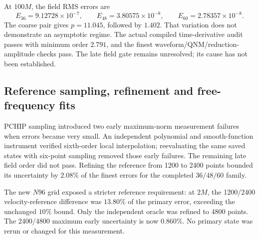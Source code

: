 \documentclass[11pt,letterpaper]{article}
\begin{document}

At $100M$, the field RMS errors are
\begin{equation}
 E_{36}=9.12728\times10^{-7},\qquad E_{48}=3.80575\times10^{-8},\qquad
 E_{60}=2.78357\times10^{-8}.
\end{equation}
The coarse pair gives $p=11.045$, followed by $1.402$. That variation does not demonstrate an asymptotic regime. The actual compiled time-derivative audit passes with minimum order $2.791$, and the finest waveform/QNM/reduction-amplitude checks pass. The late field gate remains unresolved; its cause has not been established.

\clearpage
\subsection{Reference sampling, refinement and free-frequency fits}
PCHIP sampling introduced two early maximum-norm measurement failures when errors became very small. An independent polynomial and smooth-function instrument verified sixth-order local interpolation; reevaluating the same saved states with six-point sampling removed those early failures. The remaining late field order did not pass. Refining the reference from 1200 to 2400 points bounded its uncertainty by $2.08\%$ of the finest errors for the completed $36/48/60$ family.

The new $N96$ grid exposed a stricter reference requirement: at $2M$, the 1200/2400 velocity-reference difference was $13.80\%$ of the primary error, exceeding the unchanged $10\%$ bound. Only the independent oracle was refined to 4800 points. The 2400/4800 maximum early uncertainty is now $0.860\%$. No primary state was rerun or changed for this measurement.
\end{document}

